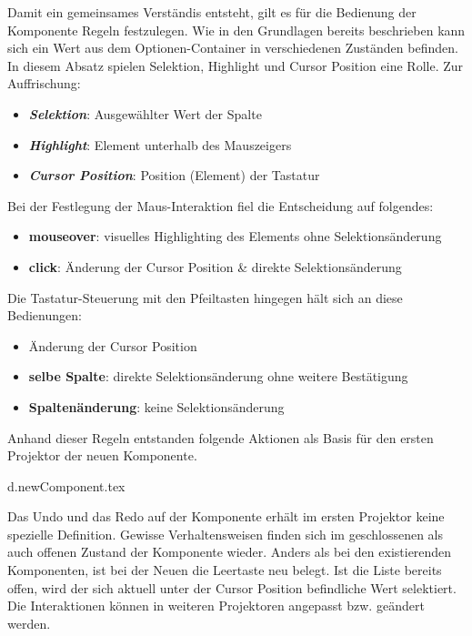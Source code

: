 Damit ein gemeinsames Verständis entsteht, gilt es für die Bedienung der Komponente Regeln festzulegen.
Wie in den Grundlagen bereits beschrieben kann sich ein Wert aus dem Optionen-Container in verschiedenen Zuständen befinden.
In diesem Absatz spielen Selektion, Highlight und Cursor Position eine Rolle.
Zur Auffrischung: 

\begin{itemize}
    \item \textbf{\emph{Selektion}}: Ausgewählter Wert der Spalte
    \item \textbf{\emph{Highlight}}: Element unterhalb des Mauszeigers
    \item \textbf{\emph{Cursor Position}}: Position (Element) der Tastatur
\end{itemize}

\noindent
Bei der Festlegung der Maus-Interaktion fiel die Entscheidung auf folgendes:

\begin{itemize}
    \item \textbf{mouseover}: visuelles Highlighting des Elements ohne Selektionsänderung
    \item \textbf{click}: Änderung der Cursor Position \& direkte Selektionsänderung
\end{itemize}

\noindent
Die Tastatur-Steuerung mit den Pfeiltasten hingegen hält sich an diese Bedienungen:

\begin{itemize}
    \item Änderung der Cursor Position
    \item \textbf{selbe Spalte}: direkte Selektionsänderung ohne weitere Bestätigung
    \item \textbf{Spaltenänderung}: keine Selektionsänderung
\end{itemize}

\noindent
Anhand dieser Regeln entstanden folgende Aktionen als Basis für den ersten Projektor der neuen Komponente. 


\clearpage
{d.newComponent.tex}

Das Undo und das Redo auf der Komponente erhält im ersten Projektor keine spezielle Definition.
Gewisse Verhaltensweisen finden sich im geschlossenen als auch offenen Zustand der Komponente wieder.
Anders als bei den existierenden Komponenten, ist bei der Neuen die Leertaste neu belegt. 
Ist die Liste bereits offen, wird der sich aktuell unter der Cursor Position befindliche Wert selektiert.
Die Interaktionen können in weiteren Projektoren angepasst bzw. geändert werden.


